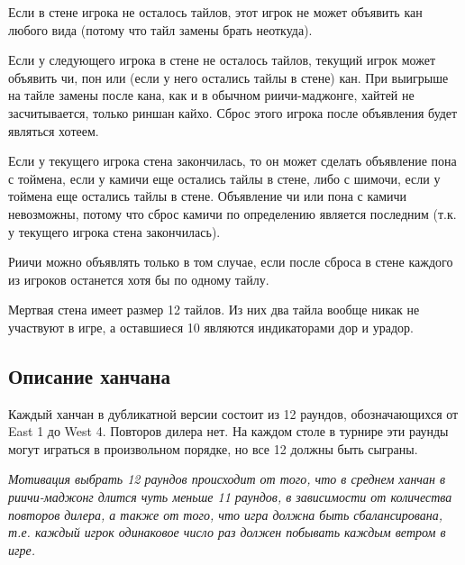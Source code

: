 \vspace{0.3cm}

Если в стене игрока не осталось тайлов, этот игрок не может объявить кан любого вида (потому что тайл замены брать неоткуда).

\vspace{0.3cm}

Если у следующего игрока в стене не осталось тайлов, текущий игрок может объявить чи, пон или (если у него остались тайлы в стене) кан. При выигрыше на тайле замены после кана, как и в обычном риичи-маджонге, хайтей не засчитывается, только риншан кайхо. Сброс этого игрока после объявления будет являться хотеем.

\vspace{0.3cm}

Если у текущего игрока стена закончилась, то он может сделать объявление пона с тоймена, если у камичи еще остались тайлы в стене, либо с шимочи, если у тоймена еще остались тайлы в стене. Объявление чи или пона с камичи невозможны, потому что сброс камичи по определению является последним (т.к. у текущего игрока стена закончилась).

\vspace{0.3cm}

Риичи можно объявлять только в том случае, если после сброса в стене каждого из игроков останется хотя бы по одному тайлу.

\vspace{0.3cm}

Мертвая стена имеет размер 12 тайлов. Из них два тайла вообще никак не участвуют в игре, а оставшиеся 10 являются индикаторами дор и урадор.

\subsection{Описание ханчана}

Каждый ханчан в дубликатной версии состоит из 12 раундов, обозначающихся от East 1 до West 4. Повторов дилера нет. На каждом столе в турнире эти раунды могут играться в произвольном порядке, но все 12 должны быть сыграны.

\vspace{0.3cm}

\textit{Мотивация выбрать 12 раундов происходит от того, что в среднем ханчан в риичи-маджонг длится чуть меньше 11 раундов, в зависимости от количества повторов дилера, а также от того, что игра должна быть сбалансирована, т.е. каждый игрок одинаковое число раз должен побывать каждым ветром в игре.}

